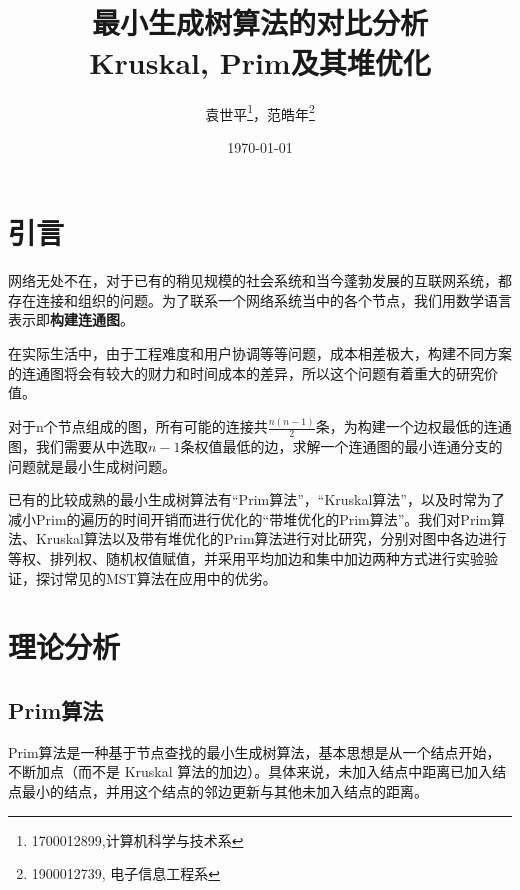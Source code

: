 \documentclass[UTF8]{ctexart}
\title{\heiti {科技交流与写作课程论文} \\ \Huge 最小生成树算法的对比分析\\ \huge Kruskal, Prim及其堆优化}
\author{\kaishu 袁世平\footnote{1700012899,计算机科学与技术系}，范皓年\footnote{1900012739, 电子信息工程系}}
\date{\today}
\begin{document}
\maketitle

\tableofcontents
\newpage
\section{引言}
网络无处不在，对于已有的稍见规模的社会系统和当今蓬勃发展的互联网系统，都存在连接和组织的问题。为了联系一个网络系统当中的各个节点，我们用数学语言表示即\textbf{构建连通图}。

在实际生活中，由于工程难度和用户协调等等问题，成本相差极大，构建不同方案的连通图将会有较大的财力和时间成本的差异，所以这个问题有着重大的研究价值。

对于n个节点组成的图，所有可能的连接共\(\frac{n(n-1)}{2}\)条，为构建一个边权最低的连通图，我们需要从中选取\(n-1\)条权值最低的边，求解一个连通图的最小连通分支的问题就是最小生成树问题。

已有的比较成熟的最小生成树算法有“Prim算法”，“Kruskal算法”\cite{RN4}，以及时常为了减小Prim的遍历的时间开销而进行优化的“带堆优化的Prim算法”。我们对Prim算法、Kruskal算法以及带有堆优化的Prim算法进行对比研究，分别对图中各边进行等权、排列权、随机权值赋值，并采用平均加边和集中加边两种方式进行实验验证，探讨常见的MST算法在应用中的优劣。


\section{理论分析}\label{sec:theo}
\subsection{Prim算法} 

Prim算法\cite{RN3}是一种基于节点查找的最小生成树算法，基本思想是从一个结点开始，不断加点（而不是 Kruskal 算法的加边）。具体来说，未加入结点中距离已加入结点最小的结点，并用这个结点的邻边更新与其他未加入结点的距离。
\end{document}
